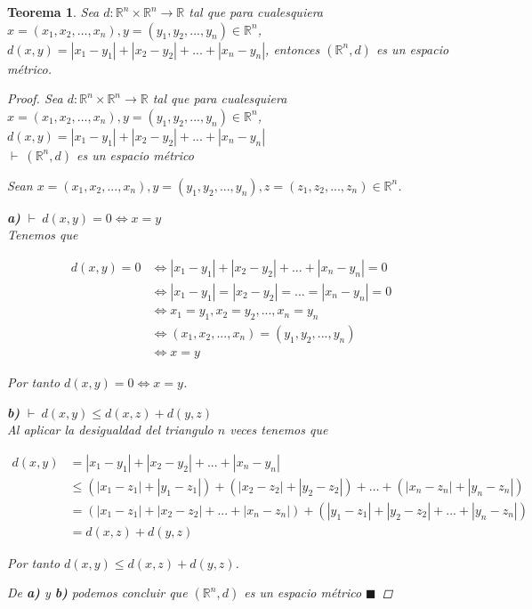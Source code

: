 \documentclass[oneside]{book} %
\theoremstyle{Teorema}
\newtheorem{Teorema}[Definicion]{Teorema}
\theoremstyle{Ejemplos}
\theoremstyle{[Obs]}
\newcommand{\abs}[1]{\left|#1\right|} %
\renewcommand{\{}{\left\lbrace} %
\renewcommand{\}}{\right\rbrace} %
\newcommand{\R}{\mathbb{R}} %
\newcommand{\Rn}{\mathbb{R}^n} %
\renewcommand{\qed}{$\blacksquare$} %
\newcommand{\pd}{$\vdash\ $} %
\begin{document}
			\begin{Teorema}\setlength{\parindent}{0em}
			
				Sea $d : \Rn \times \Rn \to \R$ tal que para cualesquiera $x = (x_1, x_2, ..., x_n), y = (y_1, y_2, ..., y_n) \in \Rn$, $d(x, y) = \abs{x_1 - y_1} + \abs{x_2 - y_2} + ... + \abs{x_n - y_n}$, entonces $(\Rn, d)$ es un espacio métrico.

				\begin{proof}
					
					Sea $d : \Rn \times \Rn \to \R$ tal que para cualesquiera $x = (x_1, x_2, ..., x_n), y = (y_1, y_2, ..., y_n) \in \Rn$, $d(x, y) = \abs{x_1 - y_1} + \abs{x_2 - y_2} + ... + \abs{x_n - y_n}$ \\ 
					\pd $(\Rn, d)$ es un espacio métrico

					Sean $x = (x_1, x_2, ..., x_n), y = (y_1, y_2, ..., y_n), z = (z_1, z_2, ..., z_n) \in \Rn$.

					\textbf{a)} \pd $d(x, y) = 0 \Leftrightarrow x = y$ \\ 
					Tenemos que 

					\begin{align*}
						d(x, y) = 0 & \Leftrightarrow \abs{x_1 - y_1} + \abs{x_2 - y_2} + ... + \abs{x_n - y_n} = 0 \\ 
						& \Leftrightarrow \abs{x_1 - y_1} = \abs{x_2 - y_2} = ... = \abs{x_n - y_n} = 0 \\ 
						& \Leftrightarrow x_1 = y_1, x_2 = y_2, ..., x_n = y_n \\ 
						& \Leftrightarrow (x_1, x_2, ..., x_n) = (y_1, y_2, ..., y_n) \\ 
						& \Leftrightarrow x = y
					\end{align*}

					Por tanto $d(x, y) = 0 \Leftrightarrow x = y$.

					\textbf{b)} \pd $d(x, y) \leq d(x, z) + d(y, z)$ \\ 
					Al aplicar la desigualdad del triangulo $n$ veces tenemos que

					\begin{align*}
						d(x, y) &= \abs{x_1 - y_1} + \abs{x_2 - y_2} + ... + \abs{x_n - y_n} \\ 
						&\leq (\abs{x_1 - z_1} + \abs{y_1 - z_1}) + (\abs{x_2 - z_2} + \abs{y_2 - z_2}) + ... + (\abs{x_n - z_n} + \abs{y_n - z_n}) \\ 
						&= (\abs{x_1 - z_1} + \abs{x_2 - z_2} + ... + \abs{x_n - z_n}) + (\abs{y_1 - z_1} + \abs{y_2 - z_2} + ... + \abs{y_n - z_n}) \\ 
						&= d(x, z) + d(y, z)
					\end{align*}

					Por tanto $d(x, y) \leq d(x, z) + d(y, z)$.

					De \textbf{a)} y \textbf{b)} podemos concluir que $(\Rn, d)$ es un espacio métrico \qed

				\end{proof}
			
			\end{Teorema}
\end{document}
